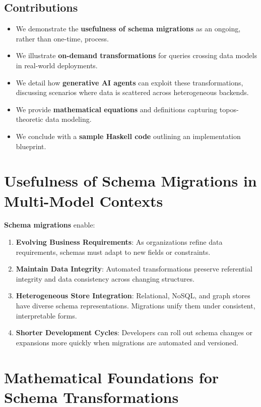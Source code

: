 \documentclass[11pt]{article}
\begin{document}
\subsection{Contributions}
\begin{itemize}
    \item We demonstrate the \textbf{usefulness of schema migrations} as an ongoing, rather than one-time, process.
    \item We illustrate \textbf{on-demand transformations} for queries crossing data models in real-world deployments.
    \item We detail how \textbf{generative AI agents} can exploit these transformations, discussing scenarios where data is scattered across heterogeneous backends.
    \item We provide \textbf{mathematical equations} and definitions capturing topos-theoretic data modeling.
    \item We conclude with a \textbf{sample Haskell code} outlining an implementation blueprint.
\end{itemize}

\section{Usefulness of Schema Migrations in Multi-Model Contexts}
\label{sec:usefulness}

\textbf{Schema migrations} enable:
\begin{enumerate}
    \item \textbf{Evolving Business Requirements}: As organizations refine data requirements, schemas must adapt to new fields or constraints.
    \item \textbf{Maintain Data Integrity}: Automated transformations preserve referential integrity and data consistency across changing structures.
    \item \textbf{Heterogeneous Store Integration}: Relational, NoSQL, and graph stores have diverse schema representations. Migrations unify them under consistent, interpretable forms.
    \item \textbf{Shorter Development Cycles}: Developers can roll out schema changes or expansions more quickly when migrations are automated and versioned.
\end{enumerate}

\section{Mathematical Foundations for Schema Transformations}
\label{sec:foundations}
\end{document}

